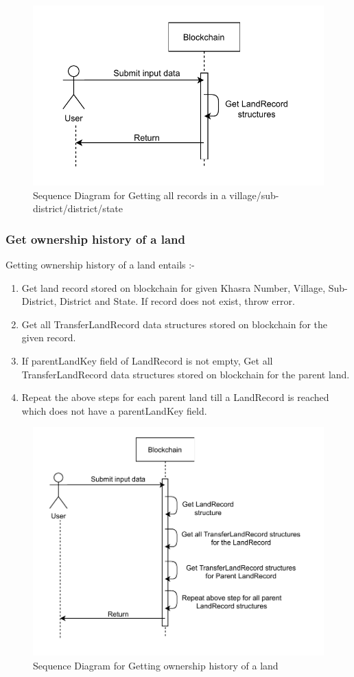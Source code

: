 \documentclass{article}
\begin{document}
        \begin{figure}[htbp]
            \includegraphics[scale=0.25]{blockchain_seq_get_records}
            \centering
            \caption{Sequence Diagram for Getting all records in a village/sub-district/district/state}
        \end{figure}


    \subsubsection{Get ownership history of a land}
        Getting ownership history of a land entails :-
        \begin{enumerate}
            \item Get land record stored on blockchain for given Khasra Number, Village, Sub-District, District and State. If record does not exist, throw error.
            \item Get all TransferLandRecord data structures stored on blockchain for the given record.
            \item If parentLandKey field of LandRecord is not empty, Get all TransferLandRecord data structures stored on blockchain for the parent land.
            \item Repeat the above steps for each parent land till a LandRecord is reached which does not have a parentLandKey field. 
        \end{enumerate}

        \begin{figure}[htbp]
            \includegraphics[scale=0.25]{blockchain_seq_get_history}
            \centering
            \caption{Sequence Diagram for Getting ownership history of a land}
        \end{figure}


    \clearpage
    
    
\end{document}
